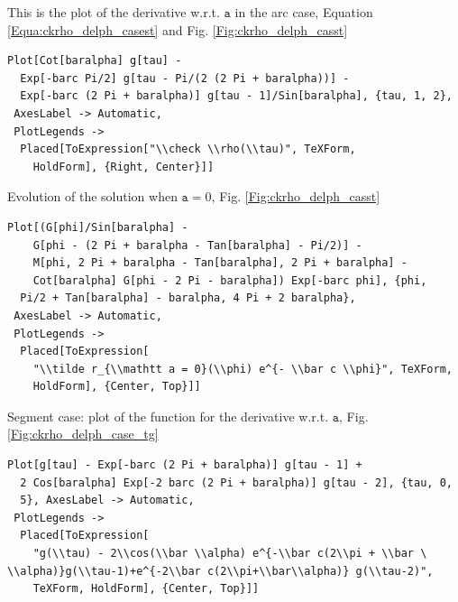 \documentclass[reqno]{amsart}
\theoremstyle{definition} \newtheorem{definition}{Definition}[section]
\theoremstyle{definition} \newtheorem{remark}[definition]{Remark}
\theoremstyle{plain} \newtheorem{lemma}[definition]{Lemma}
\theoremstyle{plain} \newtheorem{proposition}[definition]{Proposition}
\theoremstyle{plain} \newtheorem{theorem}[definition]{Theorem}
\theoremstyle{plain} \newtheorem{corollary}[definition]{Corollary}
\theoremstyle{definition} \newtheorem{example}[definition]{Example}
\theoremstyle{plain} \newtheorem{claim}[clai]{Claim}
\theoremstyle{definition} \newtheorem{assumption}[definition]{Assumption}
\theoremstyle{definition} \newtheorem{observation}[definition]{Observation}
\newcommand{\1}{\mathbbm 1}
\numberwithin{equation}{section} %
\theoremstyle{plain} \newtheorem*{theorem*}{Theorem}
\theoremstyle{plain} \newtheorem{mthm}[maintheorem]{Main Theorem}
\theoremstyle{plain} \newtheorem*{mthm*}{Main Theorem}
\theoremstyle{plain} \newtheorem*{conjecture*}{Conjecture}
\theoremstyle{plain} \newtheorem{conjecture}[definition]{Conjecture}
\theoremstyle{plain} \newtheorem*{problem*}{Problem}
\begin{document}
\bigskip


\bigskip

\noindent This is the plot of the derivative w.r.t. $\mathtt a$ in the arc case, Equation \eqref{Equa:ckrho_delph_casest} and Fig. \ref{Fig:ckrho_delph_casst}
\medskip
\begin{verbatim}
Plot[Cot[baralpha] g[tau] - 
  Exp[-barc Pi/2] g[tau - Pi/(2 (2 Pi + baralpha))] - 
  Exp[-barc (2 Pi + baralpha)] g[tau - 1]/Sin[baralpha], {tau, 1, 2}, 
 AxesLabel -> Automatic, 
 PlotLegends -> 
  Placed[ToExpression["\\check \\rho(\\tau)", TeXForm, 
    HoldForm], {Right, Center}]]
\end{verbatim}
\medskip
Evolution of the solution when $\mathtt a = 0$, Fig. \ref{Fig:ckrho_delph_casst}
\medskip
\begin{verbatim}
Plot[(G[phi]/Sin[baralpha] - 
    G[phi - (2 Pi + baralpha - Tan[baralpha] - Pi/2)] - 
    M[phi, 2 Pi + baralpha - Tan[baralpha], 2 Pi + baralpha] - 
    Cot[baralpha] G[phi - 2 Pi - baralpha]) Exp[-barc phi], {phi, 
  Pi/2 + Tan[baralpha] - baralpha, 4 Pi + 2 baralpha}, 
 AxesLabel -> Automatic, 
 PlotLegends -> 
  Placed[ToExpression[
    "\\tilde r_{\\mathtt a = 0}(\\phi) e^{- \\bar c \\phi}", TeXForm, 
    HoldForm], {Center, Top}]]
\end{verbatim}
\medskip
Segment case: plot of the function for the derivative w.r.t. $\mathtt a$, Fig. \ref{Fig:ckrho_delph_case_tg}
\medskip
\begin{verbatim}
Plot[g[tau] - Exp[-barc (2 Pi + baralpha)] g[tau - 1] + 
  2 Cos[baralpha] Exp[-2 barc (2 Pi + baralpha)] g[tau - 2], {tau, 0, 
  5}, AxesLabel -> Automatic, 
 PlotLegends -> 
  Placed[ToExpression[
    "g(\\tau) - 2\\cos(\\bar \\alpha) e^{-\\bar c(2\\pi + \\bar \
\\alpha)}g(\\tau-1)+e^{-2\\bar c(2\\pi+\\bar\\alpha)} g(\\tau-2)", 
    TeXForm, HoldForm], {Center, Top}]]
\end{verbatim}
\end{document}
